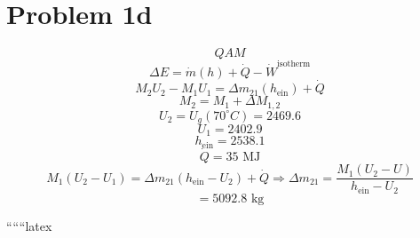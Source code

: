 \section*{Problem 1d}
\[
QAM
\]
\[
\Delta E = \dot{m}(h) + \dot{Q} - \dot{W}^{\text{isotherm}}
\]
\[
M_2 U_2 - M_1 U_1 = \Delta m_{21} (h_{\text{ein}}) + \dot{Q}
\]
\[
M_2 = M_1 + \Delta M_{1,2}
\]
\[
U_2 = U_g(70^\circ C) = 2469.6
\]
\[
U_1 = 2402.9
\]
\[
h_{\text{ein}} = 2538.1
\]
\[
\dot{Q} = 35 \text{ MJ}
\]
\[
M_1 (U_2 - U_1) = \Delta m_{21} (h_{\text{ein}} - U_2) + \dot{Q} \Rightarrow \Delta m_{21} = \frac{M_1 (U_2 - U)}{h_{\text{ein}} - U_2}
\]
\[
= 5092.8 \text{ kg}
\]

``````latex